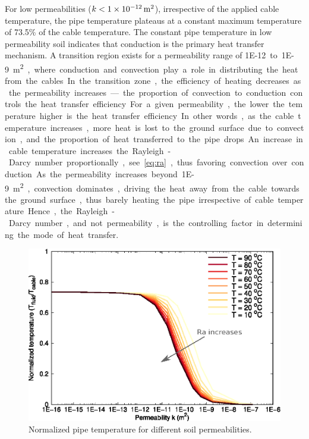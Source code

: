 \documentclass[Journal,letterpaper,InsideFigs]{ascelike-new}
\begin{document}
For low permeabilities ($k < \SI{1E-12}{\meter\squared}$), irrespective of the applied cable temperature, the pipe temperature plateaus at a constant maximum temperature of 73.5\% of the cable temperature. The constant pipe temperature in low permeability soil indicates that conduction is the primary heat transfer mechanism. A transition region exists for a permeability range of \SI{1E-12} to \SI{1E-9}{\meter\squared}, where conduction and convection play a role in distributing the heat from the cables. In the transition zone, the efficiency of heating decreases as the permeability increases—the proportion of convection to conduction controls the heat transfer efficiency. For a given permeability, the lower the temperature higher is the heat transfer efficiency. In other words, as the cable temperature increases, more heat is lost to the ground surface due to convection, and the proportion of heat transferred to the pipe drops. An increase in cable temperature increases the Rayleigh-Darcy number proportionally, see~\cref{eq:ra}, thus favoring convection over conduction. As the permeability increases beyond \SI{1E-9}{\meter\squared}, convection dominates, driving the heat away from the cable towards the ground surface, thus barely heating the pipe irrespective of cable temperature. Hence, the Rayleigh-Darcy number, and not permeability, is the controlling factor in determining the mode of heat transfer.

\begin{figure}
    \centering
    \includegraphics{figs/k-dt.eps}
    \caption{Normalized pipe temperature for different soil permeabilities.}
    \label{fig:k-temp}
\end{figure}
\end{document}
